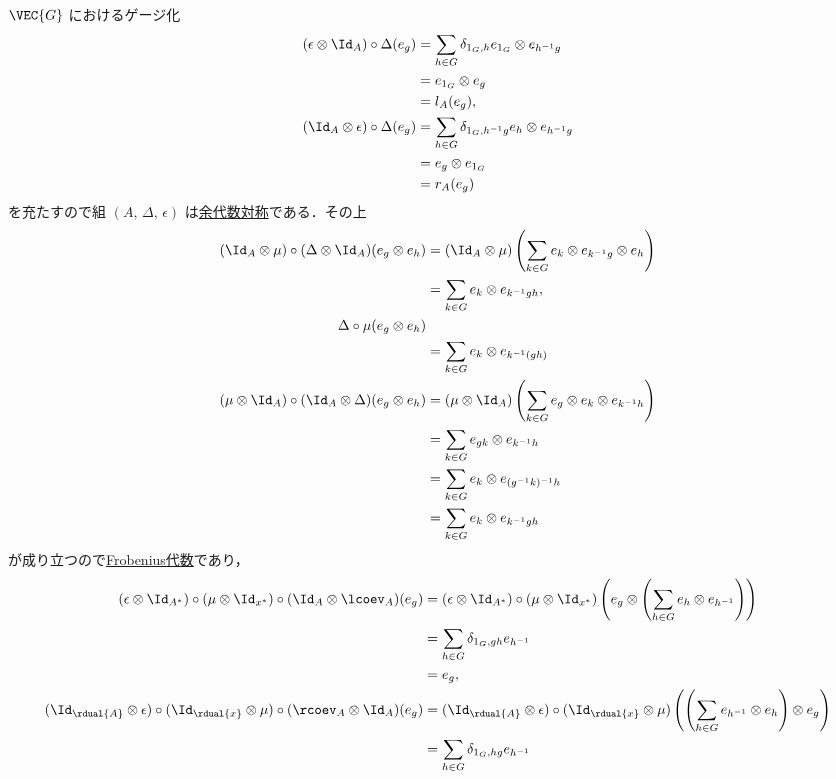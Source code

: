 \documentclass[TQFT_main]{subfiles}
\begin{document}
\begin{myexample}[label=ex:gaiging-VecG]{$\VEC{G}$ におけるゲージ化}
\begin{align}
    (\epsilon \otimes \Id_A) \circ \Delta (e_g)
    &= \sum_{h \in G} \delta_{1_G,h} e_{1_G} \otimes e_{h^{-1}g} \\
    &= e_{1_G} \otimes e_g \\
    &= l_A (e_g), \\
    (\Id_A \otimes \epsilon) \circ \Delta (e_g)
    &= \sum_{h \in G} \delta_{1_G,h^{-1} g} e_{h} \otimes e_{h^{-1}g} \\
    &= e_{g} \otimes e_{1_G} \\
    &= r_A (e_g)
\end{align}
を充たすので組 $(A,\, \Delta,\, \epsilon)$ は\hyperref[def:algobj]{余代数対称}である．その上
\begin{align}
    (\Id_A \otimes \mu) \circ (\Delta \otimes \Id_A) (e_g \otimes e_h) 
    &= (\Id_A \otimes \mu) \left(\sum_{k \in G} e_k \otimes e_{k^{-1}g} \otimes e_h \right) \\
    &= \sum_{k \in G} e_k \otimes e_{k^{-1}gh}, \\
    \Delta \circ \mu (e_g \otimes e_h) \\
    &= \sum_{k \in G} e_k \otimes e_{k^{-1}(gh)} \\
    (\mu\otimes \Id_A) \circ (\Id_A\otimes \Delta) (e_g \otimes e_h)
    &= (\mu \otimes \Id_A) \left( \sum_{k \in G} e_g \otimes e_k \otimes e_{k^{-1} h} \right)  \\
    &= \sum_{k \in G} e_{gk} \otimes e_{k^{-1} h} \\
    &= \sum_{k \in G} e_{k} \otimes e_{(g^{-1}k)^{-1} h} \\
    &= \sum_{k \in G} e_{k} \otimes e_{k^{-1} gh}
\end{align}
が成り立つので\hyperref[def:Frobenius-alg]{Frobenius代数}であり，
\begin{align}
    (\epsilon \otimes \Id_{A^*}) \circ (\mu \otimes \Id_{x^*}) \circ (\Id_A \otimes \lcoev_A) (e_g)
    &=(\epsilon \otimes \Id_{A^*}) \circ (\mu \otimes \Id_{x^*}) \left(e_g \otimes \left( \sum_{h \in G} e_h \otimes e_{h^{-1}}\right) \right) \\
    &= \sum_{h \in G} \delta_{1_G,gh} e_{h^{-1}} \\
    &= e_g, \\
    (\Id_{\rdual{A}} \otimes \epsilon) \circ (\Id_{\rdual{x}} \otimes \mu) \circ (\rcoev_A \otimes \Id_A) (e_g)
    &= (\Id_{\rdual{A}} \otimes \epsilon) \circ (\Id_{\rdual{x}} \otimes \mu) \left( \left( \sum_{h \in G} e_{h^{-1}} \otimes e_{h}\right) \otimes e_g \right) \\
    &= \sum_{h \in G} \delta_{1_G,hg} e_{h^{-1}} \\

\end{align}
\end{myexample}
\end{document}
